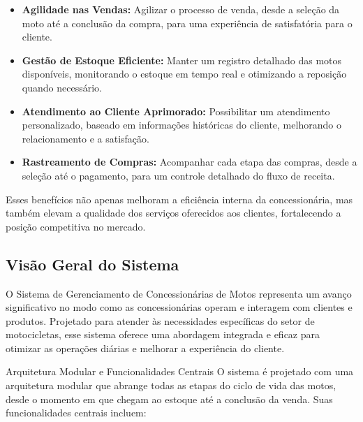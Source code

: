 		\begin{itemize}
			\item \textbf{Agilidade nas Vendas:}  Agilizar o processo de venda, desde a seleção da moto até a conclusão da compra, para uma experiência de satisfatória para o cliente.
			
			\item \textbf{Gestão de Estoque Eficiente:} Manter um registro detalhado das motos disponíveis, monitorando o estoque em tempo real e otimizando a reposição quando necessário.
			
			\item \textbf{Atendimento ao Cliente Aprimorado:} Possibilitar um atendimento personalizado, baseado em informações históricas do cliente, melhorando o relacionamento e a satisfação.
			
			\item \textbf{Rastreamento de Compras:} Acompanhar cada etapa das compras, desde a seleção até o pagamento, para um controle detalhado do fluxo de receita.
			
		\end{itemize}
		 
		 Esses benefícios não apenas melhoram a eficiência interna da concessionária, mas também elevam a qualidade dos serviços oferecidos aos clientes, fortalecendo a posição competitiva no mercado.
		 
        \subsection{Visão Geral do Sistema}
        O Sistema de Gerenciamento de Concessionárias de Motos representa um avanço significativo no modo como as concessionárias operam e interagem com clientes e produtos. Projetado para atender às necessidades específicas do setor de motocicletas, esse sistema oferece uma abordagem integrada e eficaz para otimizar as operações diárias e melhorar a experiência do cliente.
        
        Arquitetura Modular e Funcionalidades Centrais
        O sistema é projetado com uma arquitetura modular que abrange todas as etapas do ciclo de vida das motos, desde o momento em que chegam ao estoque até a conclusão da venda. Suas funcionalidades centrais incluem:
        
